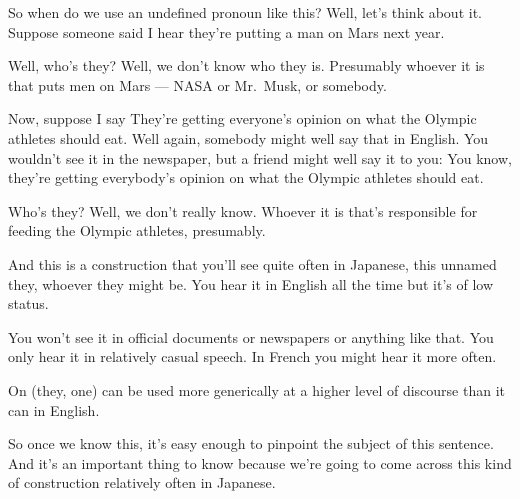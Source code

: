 So when do we use an undefined pronoun like this? Well, let's think about it. Suppose someone said I hear they're putting a man on Mars next year.

Well, who's they? Well, we don't know who they is. Presumably whoever it is that puts men on Mars --- NASA or Mr.~Musk, or somebody.

Now, suppose I say They're getting everyone's opinion on what the Olympic athletes should eat. Well again, somebody might well say that in English. You wouldn't see it in the newspaper, but a friend might well say it to you: You know, they're getting everybody's opinion on what the Olympic athletes should eat.

Who's they? Well, we don't really know. Whoever it is that's responsible for feeding the Olympic athletes, presumably.

{}

And this is a construction that you'll see quite often in Japanese, this unnamed they, whoever they might be. You hear it in English all the time but it's of low status.

{}

You won't see it in official documents or newspapers or anything like that. You only hear it in relatively casual speech. In French you might hear it more often.

On (they, one) can be used more generically at a higher level of discourse than it can in English.

So once we know this, it's easy enough to pinpoint the subject of this sentence. And it's an important thing to know because we're going to come across this kind of construction relatively often in Japanese.

\stopsectionlevel

\stopsectionlevel

\stopsectionlevel
